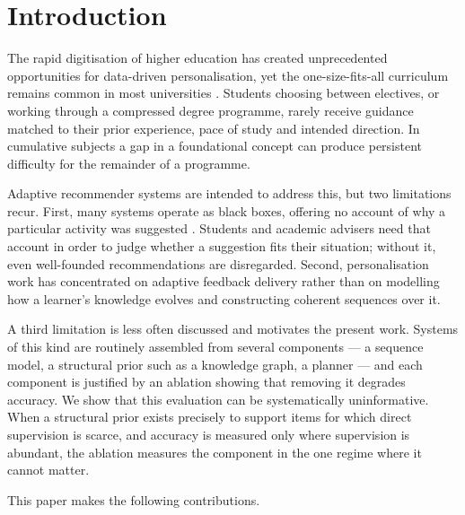 \documentclass[conference]{IEEEtran}
\begin{document}
\section{Introduction}

The rapid digitisation of higher education has created unprecedented opportunities for
data-driven personalisation, yet the one-size-fits-all curriculum remains common in most
universities \cite{li2026survey}. Students choosing between electives, or working through
a compressed degree programme, rarely receive guidance matched to their prior
experience, pace of study and intended direction. In cumulative subjects a gap in a
foundational concept can produce persistent difficulty for the remainder of a programme.

Adaptive recommender systems are intended to address this, but two limitations recur.
First, many systems operate as black boxes, offering no account of why a particular
activity was suggested \cite{ma2024survey}. Students and academic advisers need that
account in order to judge whether a suggestion fits their situation; without it, even
well-founded recommendations are disregarded. Second, personalisation work has
concentrated on adaptive feedback delivery rather than on modelling how a learner's
knowledge evolves and constructing coherent sequences over it.

A third limitation is less often discussed and motivates the present work. Systems of
this kind are routinely assembled from several components --- a sequence model, a
structural prior such as a knowledge graph, a planner --- and each component is justified
by an ablation showing that removing it degrades accuracy. We show that this evaluation
can be systematically uninformative. When a structural prior exists precisely to support
items for which direct supervision is scarce, and accuracy is measured only where
supervision is abundant, the ablation measures the component in the one regime where it
cannot matter.

This paper makes the following contributions.
\end{document}

